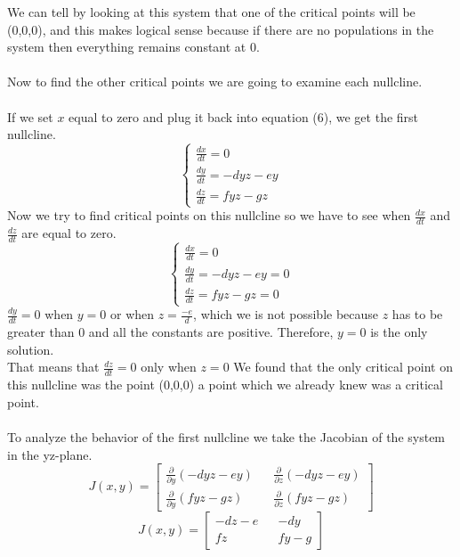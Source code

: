 \documentclass[11pt,oneside]{article}
\begin{document}
	We can tell by looking at this system that one of the critical points will be (0,0,0), and this makes logical sense because if there are no populations in the system then everything remains constant at 0.\\\\
	Now to find the other critical points we are going to examine each nullcline.\\\\
	If we set $x$ equal to zero and plug it back into equation (6), we get the first nullcline.
	\begin{equation}
	\begin{cases}
	\frac{dx}{dt} = 0\\
	\frac{dy}{dt} = -dyz - ey\\
	\frac{dz}{dt} = fyz - gz
	\end{cases}
	\end{equation}
	Now we try to find critical points on this nullcline so we have to see when $\frac{dx}{dt}$ and $\frac{dz}{dt}$ are equal to zero.
	\begin{equation}
	\begin{cases}
	\frac{dx}{dt} = 0\\
	\frac{dy}{dt} = -dyz - ey = 0\\
	\frac{dz}{dt} = fyz - gz = 0
	\end{cases}
	\end{equation}
	$\frac{dy}{dt} = 0$ when $y = 0$ or when $z = \frac{-e}{d}$, which we is not possible because $z$ has to be greater than 0 and all the constants are positive. Therefore, $y = 0$ is the only solution.\\
	That means that $\frac{dz}{dt} = 0$ only when $z = 0$
	We found that the only critical point on this nullcline was the point (0,0,0) a point which we already knew was a critical point.\\\\
	To analyze the behavior of the first nullcline we take the Jacobian of the system in the yz-plane.
	\begin{equation}
	J(x,y) = 
	\begin{bmatrix}
	\frac{\partial}{\partial y}(-dyz - ey) && \frac{\partial}{\partial z}(-dyz - ey) \\
	\frac{\partial}{\partial y}(fyz - gz) && \frac{\partial}{\partial z}(fyz - gz)
	\end{bmatrix}
	\end{equation}	
	\begin{equation}
	J(x,y) = 
	\begin{bmatrix}
	-dz - e && -dy \\
	fz && fy-g
	\end{bmatrix}
	\end{equation}
	
\end{document}
